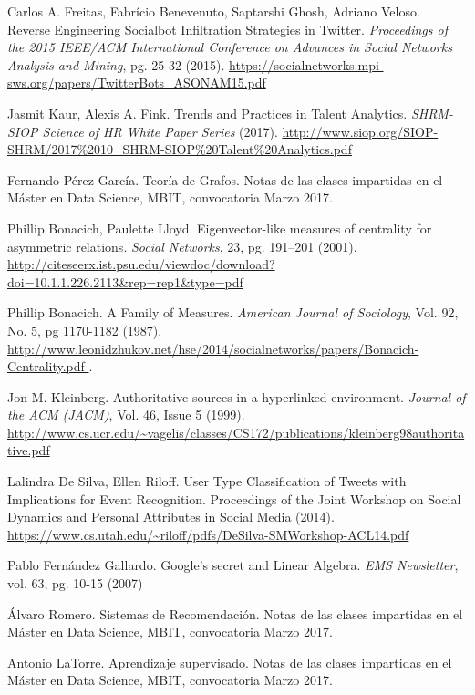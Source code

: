 \begin{thebibliography}{3}
 Carlos A. Freitas, Fabrício Benevenuto, Saptarshi Ghosh, Adriano Veloso.
Reverse Engineering Socialbot Infiltration Strategies in Twitter.
{\em Proceedings of the 2015 IEEE/ACM International Conference on Advances in Social Networks Analysis and Mining}, pg. 25-32 (2015).
\url{https://socialnetworks.mpi-sws.org/papers/TwitterBots_ASONAM15.pdf }

 Jasmit Kaur, Alexis A. Fink. Trends and Practices in Talent
Analytics. {\em SHRM-SIOP Science of HR White Paper Series} (2017).
\url{http://www.siop.org/SIOP-SHRM/2017%2010_SHRM-SIOP%20Talent%20Analytics.pdf }

 Fernando Pérez García. Teoría de Grafos. Notas de las clases
impartidas en el Máster en Data Science, MBIT, convocatoria Marzo 2017.

 Phillip Bonacich, Paulette Lloyd. 
Eigenvector-like measures of centrality for asymmetric relations.
{\em Social Networks}, 23, pg. 191–201 (2001).
\url{http://citeseerx.ist.psu.edu/viewdoc/download?doi=10.1.1.226.2113&rep=rep1&type=pdf }

 Phillip Bonacich. A Family of Measures. {\em American Journal 
of Sociology}, Vol. 92, No. 5, pg 1170-1182 (1987). 
\url{http://www.leonidzhukov.net/hse/2014/socialnetworks/papers/Bonacich-Centrality.pdf }.

Jon M. Kleinberg. Authoritative sources in a hyperlinked environment.
{\em Journal of the ACM (JACM)}, Vol. 46, Issue 5 (1999).
\url{http://www.cs.ucr.edu/~vagelis/classes/CS172/publications/kleinberg98authoritative.pdf } 


 Lalindra De Silva, Ellen Riloff. User Type Classification of Tweets with Implications 
for Event Recognition. Proceedings of the Joint Workshop on Social Dynamics and Personal Attributes 
in Social Media (2014).
\url{https://www.cs.utah.edu/~riloff/pdfs/DeSilva-SMWorkshop-ACL14.pdf }

 Pablo Fernández Gallardo. Google’s secret and Linear Algebra.
 {\em EMS Newsletter}, vol. 63, pg. 10-15 (2007)

 Álvaro Romero. Sistemas de Recomendación. Notas de las clases
impartidas en el Máster en Data Science, MBIT, convocatoria Marzo 2017.

 Antonio LaTorre. Aprendizaje supervisado. Notas de las clases
impartidas en el Máster en Data Science, MBIT, convocatoria Marzo 2017.
\end{thebibliography}